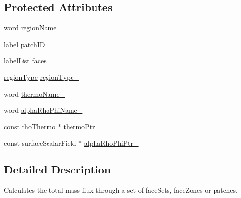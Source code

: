 \subsection*{Protected Attributes}
\begin{DoxyCompactItemize}
\item 
word \hyperlink{classFoam_1_1functionObjects_1_1TBulk_a34fba98d4cc7412f58c858b49f087393}{region\+Name\+\_\+}
\item 
label \hyperlink{classFoam_1_1functionObjects_1_1TBulk_abf52f9506022b39dbfcc5d4fe993a5df}{patch\+I\+D\+\_\+}
\item 
label\+List \hyperlink{classFoam_1_1functionObjects_1_1TBulk_a06fdd861cf7348a6cf4523679bcaee6e}{faces\+\_\+}
\item 
\hyperlink{classFoam_1_1functionObjects_1_1TBulk_a2c25b4a3d851e2d45d7a435a73598323}{region\+Type} \hyperlink{classFoam_1_1functionObjects_1_1TBulk_a09f356334695d93dbc1381b9534d95c3}{region\+Type\+\_\+}
\item 
word \hyperlink{classFoam_1_1functionObjects_1_1TBulk_add53882b43f60d6082c584ff736d37ef}{thermo\+Name\+\_\+}
\item 
word \hyperlink{classFoam_1_1functionObjects_1_1TBulk_a094f9c4501506b3aabb3d510fd8143af}{alpha\+Rho\+Phi\+Name\+\_\+}
\item 
const rho\+Thermo $\ast$ \hyperlink{classFoam_1_1functionObjects_1_1TBulk_a2fbbfae55e4c01c696d17265e2037b76}{thermo\+Ptr\+\_\+}
\item 
const surface\+Scalar\+Field $\ast$ \hyperlink{classFoam_1_1functionObjects_1_1TBulk_a5f2ba6527b700c57790b8d0997b21159}{alpha\+Rho\+Phi\+Ptr\+\_\+}
\end{DoxyCompactItemize}


\subsection{Detailed Description}
Calculates the total mass flux through a set of face\+Sets, face\+Zones or patches. 

